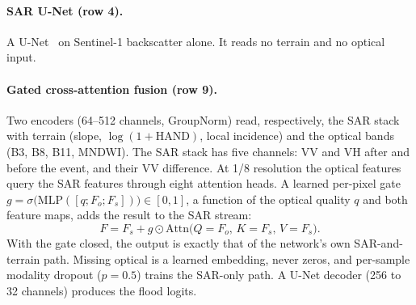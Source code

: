 \documentclass[10pt,twocolumn,a4paper]{article}
\begin{document}
\paragraph{SAR U-Net (row 4).} A U-Net~\citep{ronneberger2015unet} on Sentinel-1 backscatter alone. It reads no
terrain and no optical input.

\paragraph{Gated cross-attention fusion (row 9).} Two encoders (64--512 channels, GroupNorm) read, respectively, the SAR
stack with terrain (slope, $\log(1{+}\mathrm{HAND})$, local incidence) and the optical bands (B3, B8, B11, MNDWI). The
SAR stack has five channels: VV and VH after and before the event, and their VV difference. At 1/8 resolution the
optical features query the SAR features through eight attention heads. A learned per-pixel gate
$g=\sigma\big(\mathrm{MLP}([q;F_o;F_s])\big)\in[0,1]$, a function of the optical quality $q$ and both feature maps,
adds the result to the SAR stream:
\begin{equation}
  F = F_s + g \odot \mathrm{Attn}\big(Q = F_o,\, K = F_s,\, V = F_s\big).
\end{equation}
With the gate closed, the output is exactly that of the network's own SAR-and-terrain path. Missing optical is a
learned embedding, never zeros, and per-sample modality dropout ($p=0.5$) trains the SAR-only path. A U-Net decoder (256 to 32 channels)
produces the flood logits.
\end{document}
